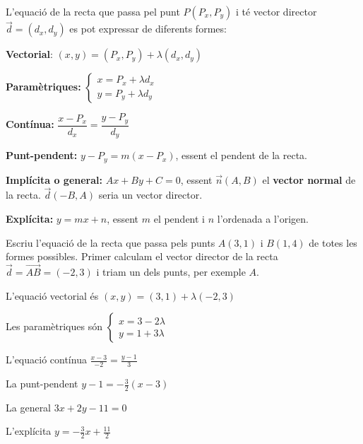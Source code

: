 \documentclass[11pt, a4paper, pdf]{article}
\begin{document}
\begin{theorybox}
	L'equació de la recta que passa pel punt $P(P_x,P_y)$ i té vector director $\vec d=(d_x, d_y)$ es pot expressar de diferents formes:
	
	\textbf{Vectorial}: $(x,y)=(P_x,P_y)+\lambda (d_x, d_y)$ \vspace{0.25cm}
	
	\textbf{Paramètriques:} $\left\{ \begin{array}{l} x=P_x+ \lambda d_x \\ y=P_y+ \lambda d_y  \end{array} \right.$\vspace{0.25cm}
	
	\textbf{Contínua:} $\dfrac{x-P_x}{d_x}=\dfrac{y-P_y}{d_y}$\vspace{0.25cm}
	
	\textbf{Punt-pendent:} $y-P_y=m(x-P_x)$, essent  el pendent de la recta.\vspace{0.25cm}
	
	
	\textbf{Implícita o general:} $Ax+By+C=0$, essent $\vec n (A,B)$ el \textbf{vector normal} de la recta. $\vec d (-B,A)$ seria un vector director.\vspace{0.25cm}
	
	
	\textbf{Explícita:} $y=mx+n$, essent $m$ el pendent i $n$ l'ordenada a l'origen.
	
\end{theorybox}

\begin{resolt}{Escriu l'equació de la recta que passa pels punts $A(3,1)$ i $B(1,4)$ de totes les formes possibles.}
	Primer calculam el vector director de la recta $\vec d = \overrightarrow{AB}=(-2,3)$ i triam un dels punts, per exemple $A$.\vspace{0.25cm}
	
	L'equació vectorial és $(x,y)=(3,1)+\lambda(-2,3)$
	
	Les paramètriques són $\left\{ \begin{array}{l} x=3-2\lambda \\ y=1+3\lambda \end{array} \right.$
	
	L'equació contínua $\frac{x-3}{-2}=\frac{y-1}{3}$
	
	La punt-pendent $y-1 = -\frac{3}{2}(x-3)$
	
	La general $3x+2y-11=0$
	
	L'explícita $y=-\frac{3}{2}x+\frac{11}{2}$
	
\end{resolt}
\end{document}
